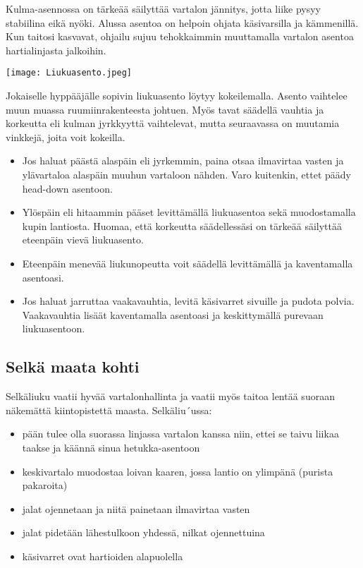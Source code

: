 Kulma-asennossa on tärkeää säilyttää vartalon jännitys, jotta liike pysyy stabiilina eikä nyöki. Alussa asentoa on helpoin ohjata käsivarsilla ja kämmenillä. Kun taitosi kasvavat, ohjailu sujuu tehokkaimmin muuttamalla vartalon asentoa hartialinjasta jalkoihin. 


\begin{Figure}\centering\texttt{[image: Liukuasento.jpeg]}\end{Figure} 


Jokaiselle hyppääjälle sopivin liukuasento löytyy kokeilemalla. Asento vaihtelee muun muassa ruumiinrakenteesta johtuen. Myös tavat säädellä vauhtia ja korkeutta eli kulman jyrkkyyttä vaihtelevat, mutta seuraavassa on muutamia vinkkejä, joita voit kokeilla. 

\begin{itemize}
\item  Jos haluat päästä alaspäin eli jyrkemmin, paina otsaa ilmavirtaa vasten ja ylävartaloa alaspäin muuhun vartaloon nähden. Varo kuitenkin, ettet päädy head-down asentoon.  
\item  Ylöspäin eli hitaammin pääset levittämällä liukuasentoa sekä muodostamalla kupin lantiosta. Huomaa, että korkeutta säädellessäsi on tärkeää säilyttää eteenpäin vievä liukuasento. 
\item  Eteenpäin menevää liukunopeutta voit säädellä levittämällä ja kaventamalla asentoasi.  
\item  Jos haluat jarruttaa vaakavauhtia, levitä käsivarret sivuille ja pudota polvia. Vaakavauhtia lisäät kaventamalla asentoasi ja keskittymällä purevaan liukuasentoon. 
\end{itemize}
\subsection{ Selkä maata kohti }
\label{freefly-lentoasennot-selka-maata-kohti}


Selkäliuku vaatii hyvää vartalonhallinta ja vaatii myös taitoa lentää suoraan näkemättä kiintopistettä maasta. Selkäliu´ussa: 

\begin{itemize}
\item  pään tulee olla suorassa linjassa vartalon kanssa niin, ettei se taivu liikaa taakse ja käännä sinua hetukka-asentoon 
\item  keskivartalo muodostaa loivan kaaren, jossa lantio on ylimpänä (purista pakaroita) 
\item  jalat ojennetaan ja niitä painetaan ilmavirtaa vasten 
\item  jalat pidetään lähestulkoon yhdessä, nilkat ojennettuina 
\item  käsivarret ovat hartioiden alapuolella 
\end{itemize}

